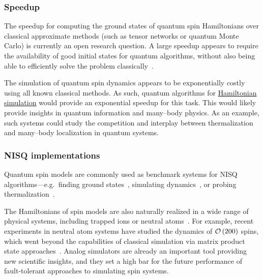 \begin{refsection}
\subsubsection*{Speedup}
The speedup for computing the ground states of quantum spin Hamiltonians over classical approximate methods (such as tensor networks or quantum Monte Carlo) is currently an open research question. A large speedup appears to require the availability of good initial states for quantum algorithms, without also being able to efficiently solve the problem classically~\cite{lee2022isThereEvidenceChemistry}.

The simulation of quantum spin dynamics appears to be exponentially costly using all known classical methods. As such, quantum algorithms for \hyperref[prim:HamiltonianSimulation]{Hamiltonian simulation} would provide an exponential speedup for this task. This would likely provide insights in quantum information and many--body physics. As an example, such systems could study the competition and interplay between thermalization and many--body localization in quantum systems. 






\subsubsection{NISQ implementations}

Quantum spin models are commonly used as benchmark systems for NISQ algorithms---e.g.~finding ground states~\cite{kandala2017VQE}, simulating dynamics~\cite{rosenberg2023dynamics}, or probing thermalization~\cite{mi2023SpinChainDissipation}. 

The Hamiltonians of spin models are also naturally realized in a wide range of physical systems, including trapped ions or neutral atoms~\cite{bloch2012qSim, georgescu2014qSim}. For example, recent experiments in neutral atom systems have studied the dynamics of $\mathcal{O}\left( 200 \right)$ spins, which went beyond the capabilities of classical simulation via matrix product state approaches~\cite{ebadi2021phasesMatter,scholl2021aFM}. Analog simulators are already an important tool providing new scientific insights, and they set a high bar for the future performance of fault-tolerant approaches to simulating spin systems. 





\end{refsection}
